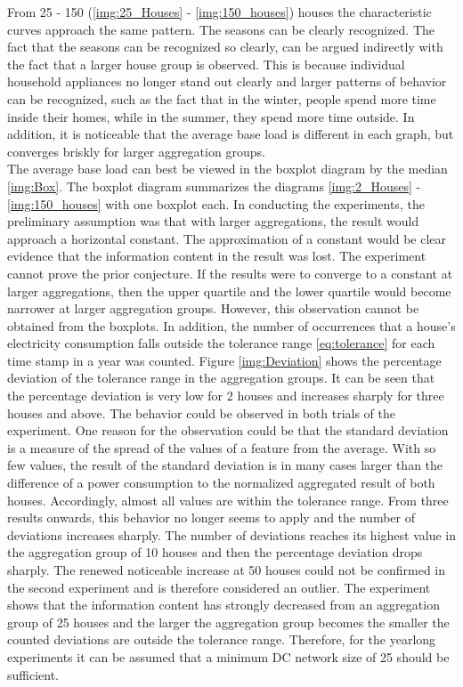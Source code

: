 From 25 - 150 (\ref{img:25_Houses} - \ref{img:150_houses}) houses the characteristic curves approach the same pattern. The seasons can be clearly recognized. The fact that the seasons can be recognized so clearly, can be argued indirectly with the fact that a larger house group is observed. This is because individual household appliances no longer stand out clearly and larger patterns of behavior can be recognized, such as the fact that in the winter, people spend more time inside their homes, while in the summer, they spend more time outside. In addition, it is noticeable that the average base load is different in each graph, but converges briskly for larger aggregation groups. \\
The average base load can best be viewed in the boxplot diagram by the median \ref{img:Box}. The boxplot diagram summarizes the diagrams \ref{img:2_Houses} - \ref{img:150_houses} with one boxplot each. In conducting the experiments, the preliminary assumption was that with larger aggregations, the result would approach a horizontal constant. The approximation of a constant would be clear evidence that the information content in the result was lost. The experiment cannot prove the prior conjecture. If the results were to converge to a constant at larger aggregations, then the upper quartile and the lower quartile would become narrower at larger aggregation groups. However, this observation cannot be obtained from the boxplots. 
In addition, the number of occurrences that a house's electricity consumption falls outside the tolerance range \ref{eq:tolerance} for each time stamp in a year was counted. Figure \ref{img:Deviation} shows the percentage deviation of the tolerance range in the aggregation groups. It can be seen that the percentage deviation is very low for 2 houses and increases sharply for three houses and above. The behavior could be observed in both trials of the experiment. One reason for the observation could be that the standard deviation is a measure of the spread of the values of a feature from the average. With so few values, the result of the standard deviation is in many cases larger than the difference of a power consumption to the normalized aggregated result of both houses. Accordingly, almost all values are within the tolerance range. From three results onwards, this behavior no longer seems to apply and the number of deviations increases sharply. The number of deviations reaches its highest value in the aggregation group of 10 houses and then the percentage deviation drops sharply. The renewed noticeable increase at 50 houses could not be confirmed in the second experiment and is therefore considered an outlier. The experiment shows that the information content has strongly decreased from an aggregation group of 25 houses and the larger the aggregation group becomes the smaller the counted deviations are outside the tolerance range. Therefore, for the yearlong experiments it can be assumed that a minimum DC network size of 25 should be sufficient.
